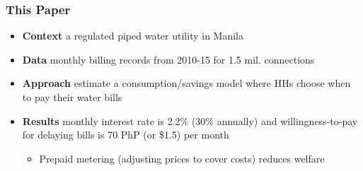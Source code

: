 \documentclass[aspectratio=149]{beamer}
\begin{document}

\begin{frame}
\frametitle{This Paper}

\begin{itemize}
\vspace{2mm}
\item \textbf{Context} \hspace{.5mm} a regulated piped water utility in Manila
\vspace{2mm}
\item \textbf{Data} \hspace{.5mm} monthly billing records from 2010-15 for 1.5 mil. connections
\vspace{2mm}
\item \textbf{Approach} \hspace{.5mm} estimate a consumption/savings model where HHs choose when to pay their water bills
\vspace{2mm}
\item \textbf{Results} \hspace{.5mm} monthly interest rate is 2.2\%  (30\% annually) and willingness-to-pay for delaying bills is 70 PhP (or \$1.5) per month 

  
\begin{itemize}

  \item Prepaid metering (adjusting prices to cover costs) reduces welfare

\end{itemize}


\end{itemize}

\end{frame}
\end{document}

